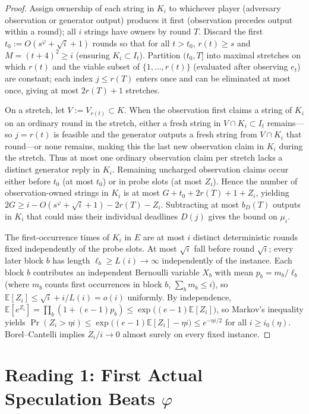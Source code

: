 \documentclass[11pt]{article}
\theoremstyle{plain}
\theoremstyle{definition}
\theoremstyle{remark}
\begin{document}
\begin{proof}
Assign ownership of each string in $K_i$ to whichever player (adversary observation or generator output) produces it first (observation precedes output within a round); all $i$ strings have owners by round $T$.
Discard the first $t_0 := O(s^\varphi + \sqrt{i} + 1)$ rounds so that for all $t > t_0$, $r(t) \ge s$ and $M = (t + 4)^2 \ge i$ (ensuring $K_i \subset I_t$).
Partition $(t_0, T]$ into maximal stretches on which $r(t)$ and the viable subset of $\{1, \dots, r(t)\}$ (evaluated after observing $e_t$) are constant; each index $j \le r(T)$ enters once and can be eliminated at most once, giving at most $2r(T) + 1$ stretches.

On a stretch, let $V := V_{r(t)} \subset K$.
When the observation first claims a string of $K_i$ on an ordinary round in the stretch, either a fresh string in $V \cap K_i \subset I_t$ remains---so $j = r(t)$ is feasible and the generator outputs a fresh string from $V \cap K_i$ that round---or none remains, making this the last new observation claim in $K_i$ during the stretch.
Thus at most one ordinary observation claim per stretch lacks a distinct generator reply in $K_i$.
Remaining uncharged observation claims occur either before $t_0$ (at most $t_0$) or in probe slots (at most $Z_i$).
Hence the number of observation-owned strings in $K_i$ is at most $G + t_0 + 2r(T) + 1 + Z_i$, yielding $2G \ge i - O(s^\varphi + \sqrt{i} + 1) - 2r(T) - Z_i$.
Subtracting at most $b_D(T)$ outputs in $K_i$ that could miss their individual deadlines $D(j)$ gives the bound on $\mu_i$.

The first-occurrence times of $K_i$ in $E$ are at most $i$ distinct deterministic rounds fixed independently of the probe slots.
At most $\sqrt{i}$ fall before round $\sqrt{i}$; every later block $b$ has length $\ell_b \ge L(i) \to \infty$ independently of the instance.
Each block $b$ contributes an independent Bernoulli variable $X_b$ with mean $p_b = m_b / \ell_b$ (where $m_b$ counts first occurrences in block $b$, $\sum_b m_b \le i$), so $\mathbb{E}[Z_i] \le \sqrt{i} + i/L(i) = o(i)$ uniformly.
By independence, $\mathbb{E}[e^{Z_i}] = \prod_b (1 + (e - 1)p_b) \le \exp\bigl((e - 1)\mathbb{E}[Z_i]\bigr)$, so Markov's inequality yields $\Pr(Z_i > \eta i) \le \exp\bigl((e - 1)\mathbb{E}[Z_i] - \eta i\bigr) \le e^{-\eta i/2}$ for all $i \ge i_0(\eta)$.
Borel--Cantelli implies $Z_i/i \to 0$ almost surely on every fixed instance.
\end{proof}

\section{Reading 1: First Actual Speculation Beats \texorpdfstring{$\varphi$}{phi}}
\end{document}
